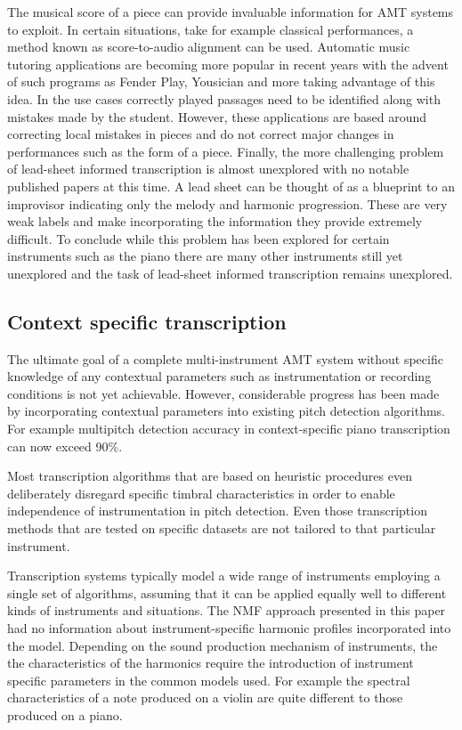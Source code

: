 The musical score of a piece can provide invaluable information for \ac{AMT} systems
to exploit. In certain situations, take for example classical performances, a
method known as score-to-audio alignment can be used. \cite{Wang2017} Automatic
music tutoring applications are becoming more popular in recent years with the
advent of such programs as Fender Play, Yousician and more taking advantage of
this idea. In the use cases correctly played passages need to be identified
along with mistakes made by the student. However, these applications are based
around correcting local mistakes in pieces and do not correct major changes in
performances such as the form of a piece.  Finally, the more challenging problem
of lead-sheet informed transcription is almost unexplored with no notable
published papers at this time. A lead sheet can be thought of as a blueprint to
an improvisor indicating only the melody and harmonic progression. These are
very weak labels and make incorporating the information they provide extremely
difficult. To conclude while this problem has been explored for certain
instruments such as the piano there are many other instruments still yet
unexplored and the task of lead-sheet informed transcription remains unexplored.

\subsection{Context specific transcription}

The ultimate goal of a complete multi-instrument \ac{AMT} system without specific
knowledge of any contextual parameters such as instrumentation or recording
conditions is not yet achievable. However, considerable progress has been made
by incorporating contextual parameters into existing pitch detection algorithms.
For example multipitch detection accuracy in context-specific piano
transcription can now exceed 90\%. \cite{context-dependent2016:Cogliati}

Most transcription algorithms that are based on heuristic procedures even
deliberately disregard specific timbral characteristics in order to enable
independence of instrumentation in pitch detection. Even those transcription
methods that are tested on specific datasets are not tailored to that particular
instrument.

Transcription systems typically model a wide range of instruments employing a
single set of algorithms, assuming that it can be applied equally well to
different kinds of instruments and situations. The \ac{NMF} approach presented in
this paper had no information about instrument-specific harmonic profiles
incorporated into the model. Depending on the sound production mechanism of
instruments, the the characteristics of the harmonics require the introduction
of instrument specific parameters in the common models used. For example the
spectral characteristics of a note produced on a violin are quite different to
those produced on a piano.

